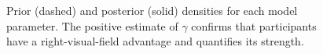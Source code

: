 \documentclass[doc,biblatex,floatsintext]{apa7}
\begin{document}
\begin{figure}
\vspace*{2pt}
\caption{Prior (dashed) and posterior (solid) densities for each model parameter. The positive estimate of $\gamma$ confirms that participants have a right-visual-field advantage and quantifies its strength.}
\label{fig06}
\end{figure}
\end{document}
